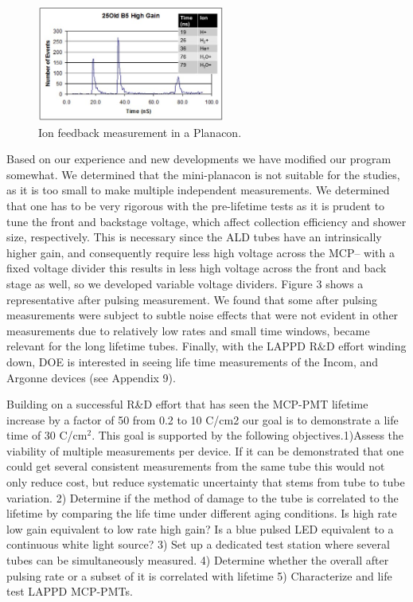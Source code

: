 \begin{figure}[htb]
\centering
\includegraphics[width=0.55\textwidth]{images/figure3Brandt.jpg}
\caption[]{Ion feedback measurement in a Planacon.}
\label{fig:ionfeedback}
\end{figure}

Based on our experience and new developments we have modified our program somewhat. We determined that the mini-planacon is not suitable for the studies, as it is too small to make multiple independent measurements. We determined that one has to be very rigorous with the pre-lifetime tests as it is prudent to tune the front and backstage voltage, which affect collection efficiency and shower size, respectively. This is necessary since the ALD tubes have an intrinsically higher gain, and consequently require less high voltage across the MCP-- with a fixed voltage divider this results in less high voltage across the front and back stage as well, so we developed variable voltage dividers. Figure 3 shows a representative after pulsing measurement. We found that some  after pulsing measurements were subject to subtle noise effects that were not evident in other measurements due to relatively low rates and small time windows, became relevant for the long lifetime tubes.  Finally, with the LAPPD R$\&$D effort winding down, DOE is interested in seeing life time measurements of the Incom, and Argonne devices (see Appendix 9). 


Building on a successful R\&D effort that has seen the MCP-PMT  lifetime increase by a factor of 50 from 0.2 to 10 C/cm2  our goal is to demonstrate a life time of 30 C/cm$^{2}$. This goal is supported by the following objectives.1)Assess the viability of multiple measurements per device. If it can be demonstrated that one could get several consistent measurements from the same tube this would not only reduce cost, but reduce systematic uncertainty that stems from tube to tube variation. 2) Determine if the method of damage to the tube is correlated to the lifetime by comparing the life time under different aging conditions.  Is high rate low gain equivalent to low rate high gain?  Is a blue pulsed LED equivalent to a continuous white light source? 3) Set up a dedicated test station where several tubes can be simultaneously measured. 4) Determine whether the overall after pulsing rate or a subset of it is correlated with lifetime 5) Characterize and life test LAPPD MCP-PMTs.

